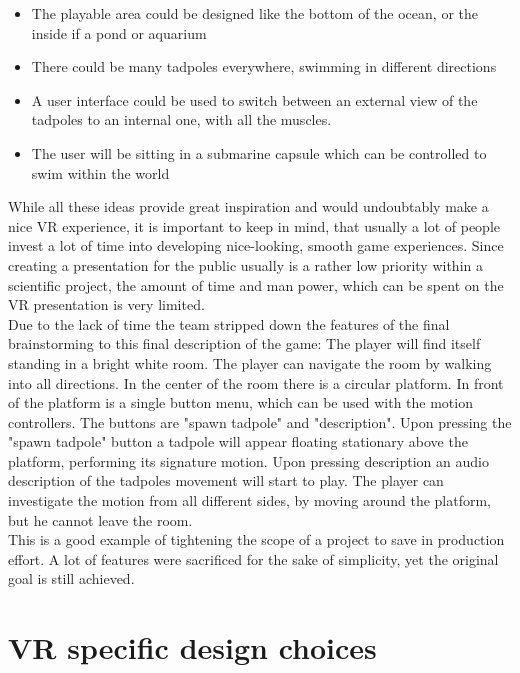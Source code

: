 \begin{itemize}
\item The playable area could be designed like the bottom of the ocean, or the inside if a pond or aquarium
\item There could be many tadpoles everywhere, swimming in different directions
\item A user interface could be used to switch between an external view of the tadpoles to an internal one, with all the muscles.
\item The user will be sitting in a submarine capsule which can be controlled to swim within the world
\end{itemize}

While all these ideas provide great inspiration and would undoubtably make a nice VR experience, it is important to keep in mind, that usually a lot of people invest a lot of time into developing nice-looking, smooth game experiences. Since creating a presentation for the public usually is a rather low priority within a scientific project, the amount of time and man power, which can be spent on the VR presentation is very limited.\\
Due to the lack of time the team stripped down the features of the final brainstorming to this final description of the game:
The player will find itself standing in a bright white room. The player can navigate the room by walking into all directions. In the center of the room there is a circular platform. In front of the platform is a single button menu, which can be used with the motion controllers. The buttons are "spawn tadpole" and "description". Upon pressing the "spawn tadpole" button a tadpole will appear floating stationary above the platform, performing its signature motion. Upon pressing description an audio description of the tadpoles movement will start to play. The player can investigate the motion from all different sides, by moving around the platform, but he cannot leave the room.\\
This is a good example of tightening the scope of a project to save in production effort. A lot of features were sacrificed for the sake of simplicity, yet the original goal is still achieved.

\section{VR specific design choices}

